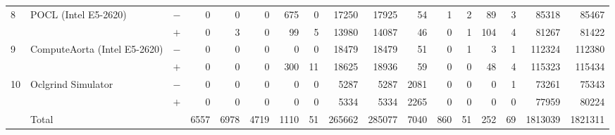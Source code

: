 \begin{tabular}{lll | rrrrrrr | rrrrrrr }
\hline
\multirow{ 2}{*}{8} & \multirow{ 2}{*}{POCL (Intel E5-2620)} & $-$ & 0 & 0 & 0 & 675 & 0 & 17250 & 17925       & 54 & 1 & 2 & 89 & 3 & 85318 & 85467 \\& & $+$ & 0 & 3 & 0 & 99 & 5 & 13980 & 14087 & 46 & 0 & 1 & 104 & 4 & 81267 & 81422 \\
\hline
\multirow{ 2}{*}{9} & \multirow{ 2}{*}{ComputeAorta (Intel E5-2620)} & $-$ & 0 & 0 & 0 & 0 & 0 & 18479 & 18479       & 51 & 0 & 1 & 3 & 1 & 112324 & 112380 \\& & $+$ & 0 & 0 & 0 & 300 & 11 & 18625 & 18936 & 59 & 0 & 0 & 48 & 4 & 115323 & 115434 \\
\hline
\multirow{ 2}{*}{10} & \multirow{ 2}{*}{Oclgrind Simulator} & $-$ & 0 & 0 & 0 & 0 & 0 & 5287 & 5287       & 2081 & 0 & 0 & 0 & 1 & 73261 & 75343 \\& & $+$ & 0 & 0 & 0 & 0 & 0 & 5334 & 5334 & 2265 & 0 & 0 & 0 & 0 & 77959 & 80224 \\
  \midrule
  
\multirow{ 2}{*}{} & \multirow{ 2}{*}{Total} & \multirow{ 2}{*}{} &
\multirow{ 2}{*}{6557} & \multirow{ 2}{*}{6978} & \multirow{ 2}{*}{4719} & \multirow{ 2}{*}{1110} & \multirow{ 2}{*}{51} & \multirow{ 2}{*}{265662} & \multirow{ 2}{*}{285077} & \multirow{ 2}{*}{7040} & \multirow{ 2}{*}{860} & \multirow{ 2}{*}{51} & \multirow{ 2}{*}{252} & \multirow{ 2}{*}{69} & \multirow{ 2}{*}{1813039} & \multirow{ 2}{*}{1821311} \\
\\

  \bottomrule
\end{tabular}

